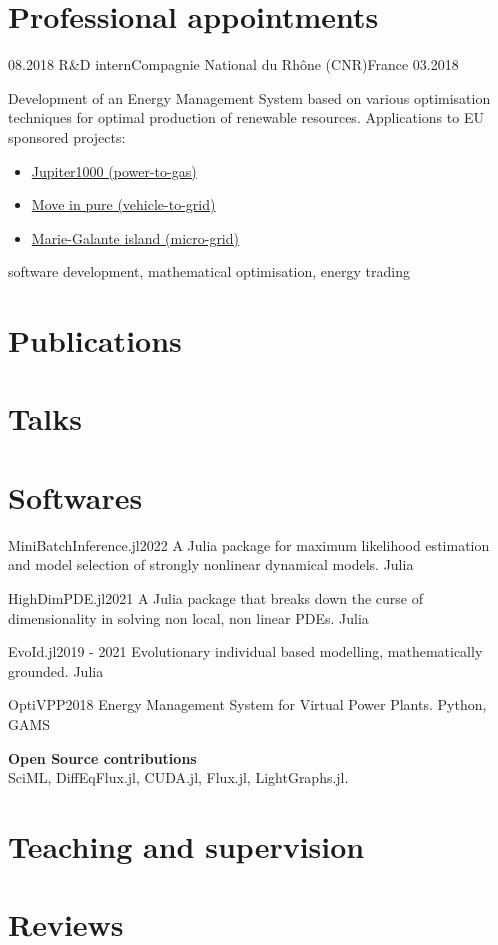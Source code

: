 \section*{Professional appointments}
\begin{experiences}
    \experience
      {08.2018}   {R\&D intern}{Compagnie National du Rh\^one (CNR)}{France}
      {03.2018} {Development of an Energy Management System based on various optimisation techniques for optimal production of renewable resources. Applications to EU sponsored projects:
      \begin{itemize}
          \item \hyperlink{https://www.jupiter1000.eu/english}{Jupiter1000 (power-to-gas)}
          \item \hyperlink{https://www.cnr.tm.fr/en/innovation/close-to-the-pulse-of-the-territories/}{Move in pure (vehicle-to-grid)}
          \item \hyperlink{https://www.youtube.com/watch?v=962bBweyx1s}{Marie-Galante island (micro-grid)}
      \end{itemize}}
                      {software development, mathematical optimisation, energy trading}
  \end{experiences}

\section*{Publications}

\section*{Talks}

\section*{Softwares}

\begin{projects}
	\project
	{MiniBatchInference.jl}{2022}
	{}
	{A Julia package for maximum likelihood estimation and model selection of strongly nonlinear dynamical models.}
	{Julia}
	
	\project
	{HighDimPDE.jl}{2021}
	{ }
	{A Julia package that breaks down the curse of dimensionality in solving non local, non linear PDEs.}
	{Julia}
				
	\project
	{EvoId.jl}{2019 - 2021}
	{ }
	{Evolutionary individual based modelling, mathematically grounded.}
	{Julia}
	
    \project
	{OptiVPP}{2018}
	{}
	{Energy Management System for Virtual Power Plants.}
	{Python, GAMS}
	
	\textbf{Open Source contributions}\\
	SciML, DiffEqFlux.jl, CUDA.jl, Flux.jl, LightGraphs.jl.
\end{projects}

\section*{Teaching and supervision}

\section*{Reviews}
